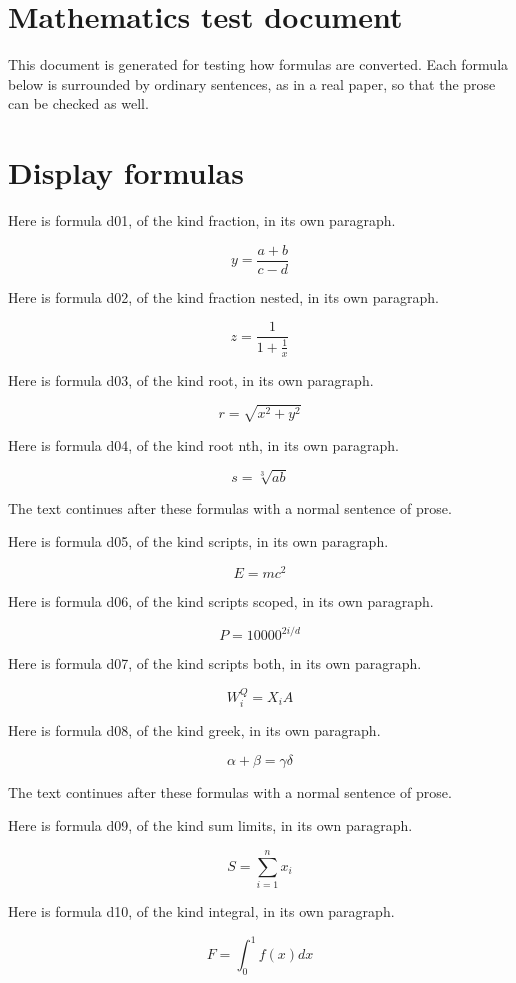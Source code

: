 \documentclass[11pt]{article}
\begin{document}
\section*{Mathematics test document}
This document is generated for testing how formulas are converted. Each formula below is surrounded by ordinary
sentences, as in a real paper, so that the prose can be checked as well.
\section{Display formulas}

Here is formula d01, of the kind fraction, in its own paragraph.

\[ y = \frac{a + b}{c - d} \]

Here is formula d02, of the kind fraction nested, in its own paragraph.

\[ z = \frac{1}{1 + \frac{1}{x}} \]

Here is formula d03, of the kind root, in its own paragraph.

\[ r = \sqrt{x^{2} + y^{2}} \]

Here is formula d04, of the kind root nth, in its own paragraph.

\[ s = \sqrt[3]{a b} \]

The text continues after these formulas with a normal sentence of prose.


Here is formula d05, of the kind scripts, in its own paragraph.

\[ E = m c^{2} \]

Here is formula d06, of the kind scripts scoped, in its own paragraph.

\[ P = 10000^{2 i / d} \]

Here is formula d07, of the kind scripts both, in its own paragraph.

\[ W_{i}^{Q} = X_{i} A \]

Here is formula d08, of the kind greek, in its own paragraph.

\[ \alpha + \beta = \gamma \delta \]

The text continues after these formulas with a normal sentence of prose.


Here is formula d09, of the kind sum limits, in its own paragraph.

\[ S = \sum_{i = 1}^{n} x_{i} \]

Here is formula d10, of the kind integral, in its own paragraph.

\[ F = \int_{0}^{1} f ( x ) d x \]
\end{document}
